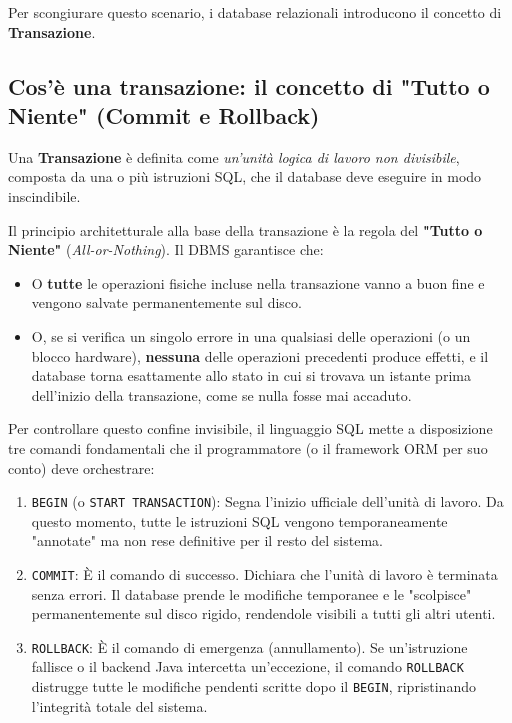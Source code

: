 Per scongiurare questo scenario, i database relazionali introducono il concetto di \textbf{Transazione}.

\subsection{Cos'è una transazione: il concetto di "Tutto o Niente" (Commit e Rollback)}

Una \textbf{Transazione} è definita come \textit{un'unità logica di lavoro non divisibile}, composta da una o più istruzioni SQL, che il database deve eseguire in modo inscindibile. 

Il principio architetturale alla base della transazione è la regola del \textbf{"Tutto o Niente"} (\textit{All-or-Nothing}). Il DBMS garantisce che:
\begin{itemize}
    \item O \textbf{tutte} le operazioni fisiche incluse nella transazione vanno a buon fine e vengono salvate permanentemente sul disco.
    \item O, se si verifica un singolo errore in una qualsiasi delle operazioni (o un blocco hardware), \textbf{nessuna} delle operazioni precedenti produce effetti, e il database torna esattamente allo stato in cui si trovava un istante prima dell'inizio della transazione, come se nulla fosse mai accaduto.
\end{itemize}

Per controllare questo confine invisibile, il linguaggio SQL mette a disposizione tre comandi fondamentali che il programmatore (o il framework ORM per suo conto) deve orchestrare:

\begin{enumerate}
    \item \texttt{BEGIN} (o \texttt{START TRANSACTION}): Segna l'inizio ufficiale dell'unità di lavoro. Da questo momento, tutte le istruzioni SQL vengono temporaneamente "annotate" ma non rese definitive per il resto del sistema.
    \item \texttt{COMMIT}: È il comando di successo. Dichiara che l'unità di lavoro è terminata senza errori. Il database prende le modifiche temporanee e le "scolpisce" permanentemente sul disco rigido, rendendole visibili a tutti gli altri utenti.
    \item \texttt{ROLLBACK}: È il comando di emergenza (annullamento). Se un'istruzione fallisce o il backend Java intercetta un'eccezione, il comando \texttt{ROLLBACK} distrugge tutte le modifiche pendenti scritte dopo il \texttt{BEGIN}, ripristinando l'integrità totale del sistema.
\end{enumerate}

